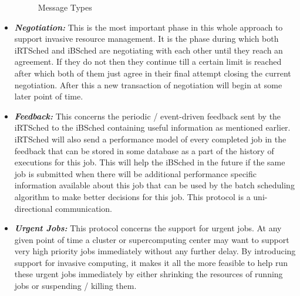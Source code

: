 \begin{itemize}
\begin{figure}[h]
\caption{Message Types}
\label{fig:8}
\end{figure}
\item \textbf{\textit{Negotiation:}} This is the most important phase in this whole approach to support invasive resource management. It is the phase during which both iRTSched and iBSched are negotiating with each other until they reach an agreement. If they do not then they continue till a certain limit is reached after which both of them just agree in their final attempt closing the current negotiation. After this a new transaction of negotiation will begin at some later point of time.
\item \textbf{\textit{Feedback:}} This concerns the periodic / event-driven feedback sent by the iRTSched to the iBSched containing useful information as mentioned earlier. iRTSched will also send a performance model of every completed job in the feedback that can be stored in some database as a part of the history of executions for this job. This will help the iBSched in the future if the same job is submitted when there will be additional performance specific information available about this job that can be used by the batch scheduling algorithm to make better decisions for this job. This protocol is a uni-directional communication.
\item \textbf{\textit{Urgent Jobs:}} This protocol concerns the support for urgent jobs. At any given point of time a cluster or supercomputing center may want to support very high priority jobs immediately without any further delay. By introducing support for invasive computing, it makes it all the more feasible to help run these urgent jobs immediately by either shrinking the resources of running jobs or suspending / killing them.
\end{itemize}
